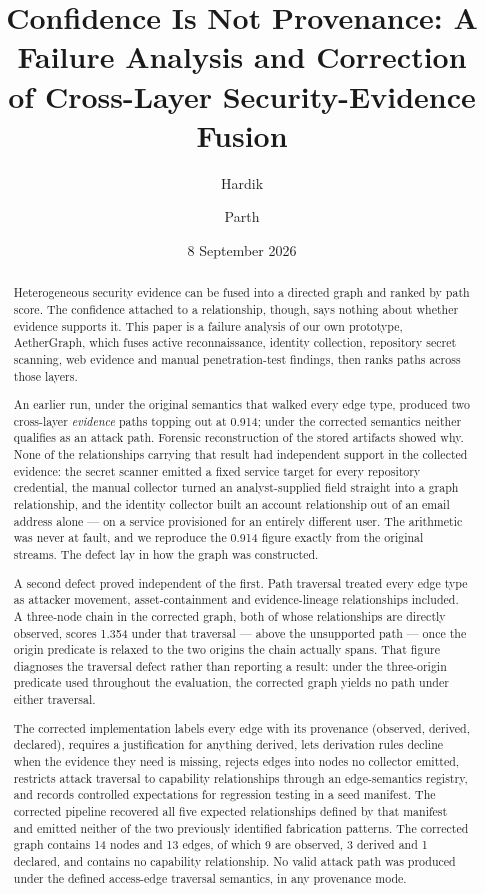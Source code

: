 \documentclass[11pt,a4paper]{article}
\title{\textbf{Confidence Is Not Provenance: A Failure Analysis and Correction\\
of Cross-Layer Security-Evidence Fusion}}
\author[1,2,$\ast$]{Hardik}
\author[2,$\ast$]{Parth}
\affil[1]{Indian Institute of Technology Patna}
\affil[2]{Vivekananda Institute of Professional Studies -- Technical Campus (VIPS-TC), Delhi}
\affil[$\ast$]{These authors contributed equally and are joint first authors.}
\affil[ ]{\small Corresponding author: \texttt{hardikahlawat13@gmail.com}}
\date{8 September 2026}
\begin{document}
\maketitle

\begin{abstract}
Heterogeneous security evidence can be fused into a directed graph and ranked by path score. The confidence attached to a relationship, though, says nothing about whether evidence supports it. This paper is a failure analysis of our own prototype, AetherGraph, which fuses active reconnaissance, identity collection, repository secret scanning, web evidence and manual penetration-test findings, then ranks paths across those layers.

An earlier run, under the original semantics that walked every edge type, produced two cross-layer \emph{evidence} paths topping out at 0.914; under the corrected semantics neither qualifies as an attack path. Forensic reconstruction of the stored artifacts showed why. None of the relationships carrying that result had independent support in the collected evidence: the secret scanner emitted a fixed service target for every repository credential, the manual collector turned an analyst-supplied field straight into a graph relationship, and the identity collector built an account relationship out of an email address alone --- on a service provisioned for an entirely different user. The arithmetic was never at fault, and we reproduce the 0.914 figure exactly from the original streams. The defect lay in how the graph was constructed.

A second defect proved independent of the first. Path traversal treated every edge type as attacker movement, asset-containment and evidence-lineage relationships included. A three-node chain in the corrected graph, both of whose relationships are directly observed, scores 1.354 under that traversal --- above the unsupported path --- once the origin predicate is relaxed to the two origins the chain actually spans. That figure diagnoses the traversal defect rather than reporting a result: under the three-origin predicate used throughout the evaluation, the corrected graph yields no path under either traversal.

The corrected implementation labels every edge with its provenance (observed, derived, declared), requires a justification for anything derived, lets derivation rules decline when the evidence they need is missing, rejects edges into nodes no collector emitted, restricts attack traversal to capability relationships through an edge-semantics registry, and records controlled expectations for regression testing in a seed manifest. The corrected pipeline recovered all five expected relationships defined by that manifest and emitted neither of the two previously identified fabrication patterns. The corrected graph contains 14 nodes and 13 edges, of which 9 are observed, 3 derived and 1 declared, and contains no capability relationship. No valid attack path was produced under the defined access-edge traversal semantics, in any provenance mode.


\end{abstract}
\end{document}
